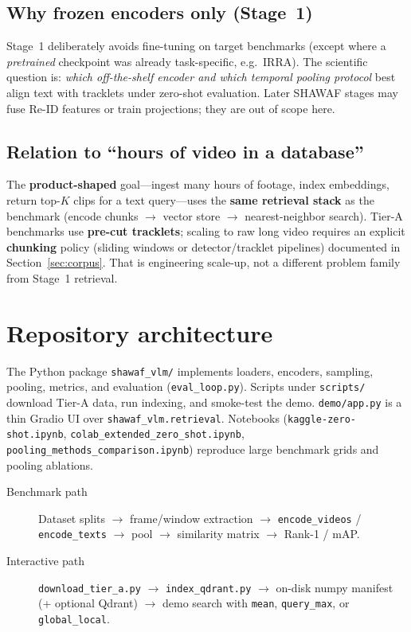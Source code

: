 \documentclass[11pt,a4paper]{article}
\begin{document}
\subsection{Why frozen encoders only (Stage~1)}
Stage~1 deliberately avoids fine-tuning on target benchmarks (except where a \emph{pretrained} checkpoint was already task-specific, e.g.\ IRRA).
The scientific question is: \emph{which off-the-shelf encoder and which temporal pooling protocol} best align text with tracklets under zero-shot evaluation.
Later SHAWAF stages may fuse Re-ID features or train projections; they are out of scope here.

\subsection{Relation to ``hours of video in a database''}
The \textbf{product-shaped} goal---ingest many hours of footage, index embeddings, return top-$K$ clips for a text query---uses the \textbf{same retrieval stack} as the benchmark (encode chunks $\rightarrow$ vector store $\rightarrow$ nearest-neighbor search).
Tier-A benchmarks use \textbf{pre-cut tracklets}; scaling to raw long video requires an explicit \textbf{chunking} policy (sliding windows or detector/tracklet pipelines) documented in Section~\ref{sec:corpus}.
That is engineering scale-up, not a different problem family from Stage~1 retrieval.

\section{Repository architecture}

The Python package \texttt{shawaf\_vlm/} implements loaders, encoders, sampling, pooling, metrics, and evaluation (\texttt{eval\_loop.py}).
Scripts under \texttt{scripts/} download Tier-A data, run indexing, and smoke-test the demo.
\texttt{demo/app.py} is a thin Gradio UI over \texttt{shawaf\_vlm.retrieval}.
Notebooks (\texttt{kaggle-zero-shot.ipynb}, \texttt{colab\_extended\_zero\_shot.ipynb}, \texttt{pooling\_methods\_comparison.ipynb}) reproduce large benchmark grids and pooling ablations.

\begin{description}
  \item[Benchmark path] Dataset splits $\rightarrow$ frame/window extraction $\rightarrow$ \texttt{encode\_videos} / \texttt{encode\_texts} $\rightarrow$ pool $\rightarrow$ similarity matrix $\rightarrow$ Rank-1 / mAP.
  \item[Interactive path] \texttt{download\_tier\_a.py} $\rightarrow$ \texttt{index\_qdrant.py} $\rightarrow$ on-disk numpy manifest (+ optional Qdrant) $\rightarrow$ demo search with \texttt{mean}, \texttt{query\_max}, or \texttt{global\_local}.
\end{description}
\end{document}
